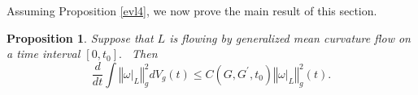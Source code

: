 \documentclass[12pt,letterpaper]{amsart}%
\newcounter{mycounter}
\numberwithin{mycounter}{section}
\theoremstyle{plain}
\newtheorem{proposition}[mycounter]{Proposition}
\numberwithin{equation}{section}
\theoremstyle{definition}
\begin{document}
Assuming Proposition \ref{evl4}, we now prove the main result of this section.

\begin{proposition}
Suppose that $L$ is flowing by generalized mean curvature flow on a time
interval $\left[ 0,t_{0}\right] .$ \ Then 
\begin{equation*}
\frac{d}{dt}\int \left\Vert \omega |_{L}\right\Vert _{g}^{2}dV_{g}(t)\leq
C(G,G^{\prime },t_{0})\left\Vert \omega |_{L}\right\Vert _{g}^{2}(t).
\end{equation*}
\end{proposition}
\end{document}
